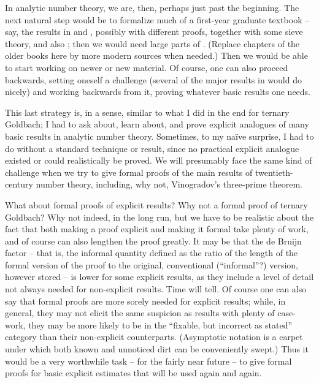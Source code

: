 In analytic number theory, we are, then, perhaps just past the beginning.
The next natural step would be to formalize much of a first-year graduate
textbook -- say, the results in \cite{MR0217022} and \cite{MR2378655},
possibly with different
proofs, together with some sieve theory, and also \cite{zbMATH03968684};
then we would need large parts of \cite{MR2061214}.
(Replace chapters of the older books here by more modern sources when
needed.) Then we would be able to
start working on newer or new material. Of course, one can also proceed
backwards, setting oneself a challenge (several of the major results in
\cite{MR2061214} would do nicely) and working backwards from it,
proving whatever basic results one needs.

This last strategy is, in a sense, similar to what I did in the end for
ternary Goldbach; I had to ask about, learn about, and prove explicit
analogues of many basic results in analytic number theory. Sometimes, to my
na\"ive surprise, I had to do without a standard technique or result, since
no practical explicit analogue existed or could realistically be proved.
We will presumably face the same kind of challenge when we try to give 
formal proofs of the main results of twentieth-century number theory,
including, why not, Vinogradov's three-prime theorem.

What about formal proofs of explicit results? Why not a formal proof of
ternary Goldbach? Why not indeed, in the long run, but we have to be realistic
about the fact that both making a proof explicit and making it formal take
plenty of work, and of course can also lengthen the proof greatly. It may be
that the de Bruijn factor -- that is, the informal quantity defined as the
ratio of the length of the formal version of the proof to the original, conventional (``informal''?) version, however stored -- is lower for some explicit results, as they
include a level of detail not always needed for non-explicit results. Time will
tell. Of course one can also say that formal proofs are more sorely needed
for explicit results; while, in general,
they may not elicit the same suspicion as results with plenty of case-work,
they may be more likely to be in the ``fixable, but incorrect as stated''
category than their non-explicit counterparts. (Asymptotic notation is
a carpet under which both known and unnoticed dirt can be conveniently swept.)
Thus it would be a very worthwhile task -- for the fairly near future --
to give formal proofs for basic explicit
estimates that will be used again and again.

